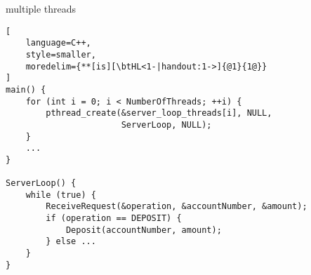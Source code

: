 \begin{frame}[fragile,label=threadedServerLoop]{multiple threads}
\begin{lstlisting}[
    language=C++,
    style=smaller,
    moredelim={**[is][\btHL<1-|handout:1->]{@1}{1@}}
]
main() {
    for (int i = 0; i < NumberOfThreads; ++i) {
        pthread_create(&server_loop_threads[i], NULL,
                       ServerLoop, NULL);
    }
    ...
}

ServerLoop() {
    while (true) {
        ReceiveRequest(&operation, &accountNumber, &amount);
        if (operation == DEPOSIT) {
            Deposit(accountNumber, amount);
        } else ...
    }
}
\end{lstlisting}
\end{frame}
